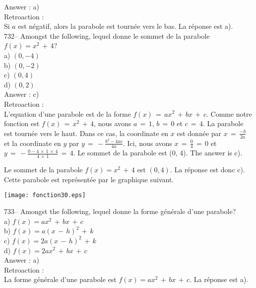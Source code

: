 ﻿\documentclass[letterpaper, 12pt]{article}
\begin{document}
Answer : a)\\

Retroaction : \\
Si $a$ est n\'egatif, alors la parabole est tourn\'ee vers le bas.  La
r\'eponse est a).\\

732-- Amongst the following, lequel donne le sommet de la parabole
$f\left( x\right) =x^{2}\,+\,4$?\\
a) $(0,-4)$\\
b) $(0,-2)$\\
c) $(0,4)$\\
d) $(0,2)$\\

Answer : c)\\

Retroaction : \\
L'equation d'une parabole est de la forme
$f(x)\,=\,ax^2\,+\,bx\,+\,c$. Comme notre fonction est
$f(x)\,=\,x^2\,+\,4$, nous avons $a\,=\,1$, $b\,=\,0$ et $c\,=\,4$.
La parabole est tourn\'ee vers le haut. Dans ce cas, la coordinate
en $x$ est donn\'ee par $x\,=\, \frac{-b}{2a}$ et la coordinate en
$y$ par $y\,=\, -\frac{b^2-4ac}{4a}$. Ici, nous avons
$x\,=\,\frac{0}{4}\,=\,0$ et
$y\,=\,-\frac{0-4\,\times\,1\,\times\,4}{4\,\times\,1}\,=\,4$. Le
sommet de la parabole est (0, 4). The answer is c).


Le sommet de la parabole $f\left( x\right) =x^{2}\,+\,4$ est $(0,4)$.  La
r\'eponse est donc c).  Cette parabole est repr\'esent\'ee par le graphique
suivant.\\
    \begin{center}
    \texttt{[image: fonction30.eps]}
    \end{center}

733-- Amongst the following, lequel donne la forme g\'en\'erale
d'une parabole?\\
a) $f(x)=ax^{2}\,+\,bx\,+\,c$\\
b) $f(x)=a(x\,-\,h)^{2}\,+\,k$\\
c) $f(x)=2a(x\,-\,h)^{2}\,+\,k$\\
d) $f(x)=2ax^{2}\,+\,bx\,+\,c$\\

Answer : a)\\

Retroaction : \\
La forme g\'en\'erale d'une parabole est $f(x)=ax^{2}\,+\,bx\,+\,c$.  La
r\'eponse est a).\\
\end{document}

